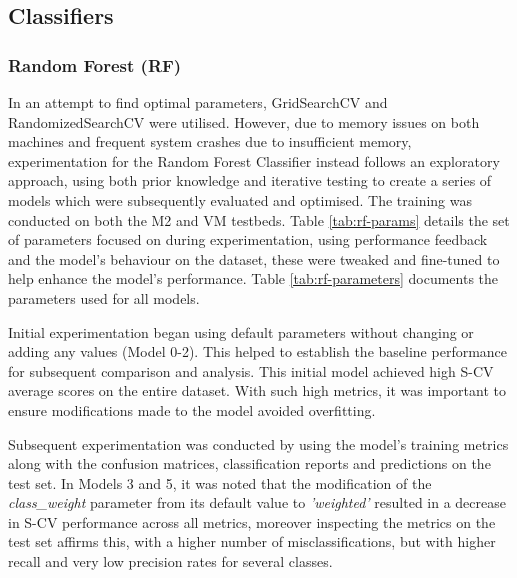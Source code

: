 \subsection{Classifiers}


\subsubsection{Random Forest (RF)}
\label{sec:RF}

In an attempt to find optimal parameters, GridSearchCV and RandomizedSearchCV were utilised. However, due to memory issues on both machines and frequent system crashes due to insufficient memory, experimentation for the Random Forest Classifier instead follows an exploratory approach, using both prior knowledge and iterative testing to create a series of models which were subsequently evaluated and optimised. The training was conducted on both the M2 and VM testbeds. Table \ref{tab:rf-params} details the set of parameters focused on during experimentation, using performance feedback and the model's behaviour on the dataset, these were tweaked and fine-tuned to help enhance the model's performance. Table \ref{tab:rf-parameters} documents the parameters used for all models.

\medskip

Initial experimentation began using default parameters without changing or adding any values (Model 0-2). This helped to establish the baseline performance for subsequent comparison and analysis. This initial model achieved high S-CV average scores on the entire dataset. With such high metrics, it was important to ensure modifications made to the model avoided overfitting. 

\medskip

Subsequent experimentation was conducted by using the model's training metrics along with the confusion matrices, classification reports and predictions on the test set. In Models 3 and 5, it was noted that the modification of the \textit{class\_weight} parameter from its default value to \textit{'weighted'} resulted in a decrease in S-CV performance across all metrics, moreover inspecting the metrics on the test set affirms this, with a higher number of misclassifications, but with higher recall and very low precision rates for several classes. 

